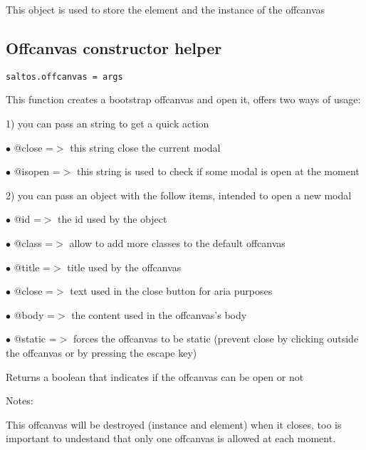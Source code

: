 \documentclass[a4paper]{book}
\begin{document}
This object is used to store the element and the instance of the offcanvas

\hypertarget{toc415}{}
\subsection{Offcanvas constructor helper}

\begin{lstlisting}
saltos.offcanvas = args
\end{lstlisting}

This function creates a bootstrap offcanvas and open it, offers two ways of usage:

1) you can pass an string to get a quick action

\begin{compactitem}
\item[\color{myblue}$\bullet$] @close  =$>$ this string close the current modal
\item[\color{myblue}$\bullet$] @isopen =$>$ this string is used to check if some modal is open at the moment
\end{compactitem}

2) you can pass an object with the follow items, intended to open a new modal

\begin{compactitem}
\item[\color{myblue}$\bullet$] @id     =$>$ the id used by the object
\item[\color{myblue}$\bullet$] @class  =$>$ allow to add more classes to the default offcanvas
\item[\color{myblue}$\bullet$] @title  =$>$ title used by the offcanvas
\item[\color{myblue}$\bullet$] @close  =$>$ text used in the close button for aria purposes
\item[\color{myblue}$\bullet$] @body   =$>$ the content used in the offcanvas's body
\item[\color{myblue}$\bullet$] @static =$>$ forces the offcanvas to be static (prevent close by clicking outside the
           offcanvas or by pressing the escape key)
\end{compactitem}

Returns a boolean that indicates if the offcanvas can be open or not

Notes:

This offcanvas will be destroyed (instance and element) when it closes, too is important
to undestand that only one offcanvas is allowed at each moment.
\end{document}
